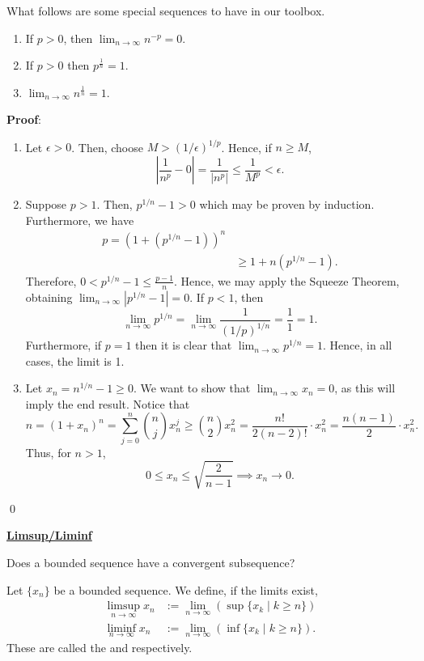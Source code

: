 \begin{theorem}
What follows are some special sequences to have in our toolbox. 
\begin{enumerate}
    \item If $p>0$, then $\lim_{n\to \infty} n^{-p} = 0$.
    \item If $p>0$ then $p^{\frac{1}{n}} = 1$. 
    \item $\lim_{n\to \infty} n^{\frac{1}{n}} = 1$.
\end{enumerate}
\end{theorem}
\textbf{Proof}:
\begin{enumerate}
    \item Let $\epsilon>0$. Then, choose $M > (1/\epsilon)^{1/p}$. Hence, if $n\geq M$,
    \[
    \left|\frac{1}{n^p} - 0\right| = \frac{1}{|n^p|} \leq \frac{1}{M^p} < \epsilon. 
    \]
    \item Suppose $p>1$. Then, $p^{1/n} -1 >0$ which may be proven by induction. Furthermore, we have 
    \begin{align*}
        p = (1+(p^{1/n} -1))^n \\
        &\geq 1 + n(p^{1/n}-1).
    \end{align*}
    Therefore, $0 < p^{1/n}-1 \leq \frac{p-1}{n}$. Hence, we may apply the Squeeze Theorem, obtaining $\lim_{n\to \infty} |p^{1/n}-1| = 0$. If $p< 1$, then
    \[
    \lim_{n\to \infty} p^{1/n} = \lim_{n\to \infty} \frac{1}{(1/p)^{1/n}} = \frac{1}{1} =1.
    \]
    Furthermore, if $p =1$ then it is clear that $\lim_{n\to \infty} p^{1/n} = 1$. Hence, in all cases, the limit is 1.
    \item Let $x_n = n^{1/n}-1 \geq 0$. We want to show that $\lim_{n\to \infty} x_n = 0$, as this will imply the end result. Notice that 
    \[
        n = (1+x_n)^n = \sum_{j=0}^n {n\choose j} x_n^j \geq {n\choose 2} x_n^2 = \frac{n!}{2(n-2)!} \cdot x_n^2 = \frac{n(n-1)}{2} \cdot x_n^2.
    \]
    Thus, for $n>1$,
    \[
    0 \leq x_n \leq \sqrt{\frac{2}{n-1}} \implies x_n \to 0.
    \]
\end{enumerate} \qed 

\noindent\underline{\textbf{Limsup/Liminf}}
\begin{question}
Does a bounded sequence have a convergent subsequence?
\end{question}

\begin{definition}
Let $\{x_n\}$ be a bounded sequence. We define, if the limits exist, 
\begin{align*}
\limsup_{n\to \infty} x_n &:= \lim_{n\to \infty}(\sup\{x_k \mid k \geq n\}) \\
\liminf_{n\to \infty} x_n &:= \lim_{n\to \infty}(\inf\{x_k \mid k \geq n\}).
\end{align*}
These are called the  and  respectively.
\end{definition}

